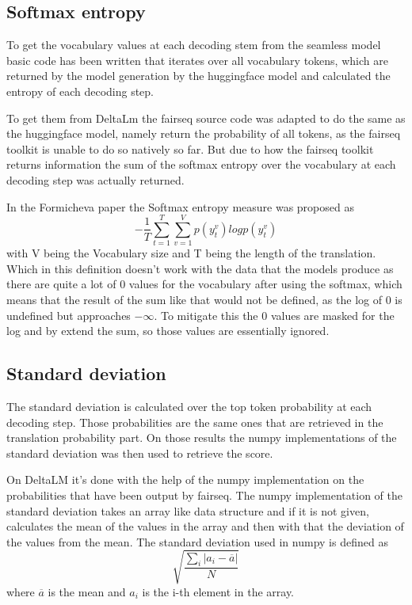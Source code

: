 \subsection{Softmax entropy}
To get the vocabulary values at each decoding stem from the seamless model basic code has been written that iterates over all vocabulary tokens, which are returned by the model generation by the huggingface model and calculated the entropy of each decoding step.

To get them from DeltaLm the fairseq source code was adapted to do the same as the huggingface model, namely return the probability of all tokens, as the fairseq toolkit is unable to do so natively so far.
But due to how the fairseq toolkit returns information the sum of the softmax entropy over the vocabulary at each decoding step was actually returned. 

In the Formicheva \cite{fomicheva2020unsupervised} paper the Softmax entropy measure was proposed as $$-\frac{1}{T}\sum_{t=1}^T\sum_{v=1}^Vp(y_t^v)logp(y_t^v)$$ with V being the Vocabulary size and T being the length of the translation. Which in this definition doesn't work with the data that the models produce as there are quite a lot of 0 values for the vocabulary after using the softmax, which means that the result of the sum like that would not be defined, as the log of 0 is undefined but approaches $-\infty$. To mitigate this the 0 values are masked for the log and by extend the sum, so those values are essentially ignored. 

\subsection{Standard deviation }
The standard deviation is calculated over the top token probability at each decoding step. 
Those probabilities are the same ones that are retrieved in the translation probability part.
On those results the numpy implementations of the standard deviation\cite{numpystddiv} was then used to retrieve the score.

On DeltaLM it's done with the help of the numpy implementation on the probabilities that have been output by fairseq. 
The numpy implementation of the standard deviation takes an array like data structure and if it is not given, calculates the mean of the values in the array and then with that the deviation of the values from the mean. 
The standard deviation used in numpy is defined as $$\sqrt{\frac{\sum_i |a_i-\overline{a}|}{N}}$$ where $\overline{a}$ is the mean and $a_i$ is the i-th element in the array.

